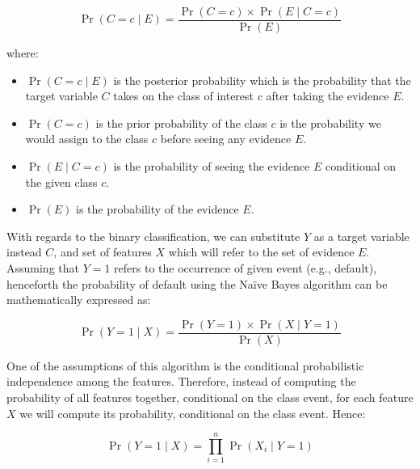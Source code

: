 \begin{equation}\label{eq}
    \operatorname{Pr}\left(C=c \mid E \right) = \frac{\operatorname{Pr}\left(C=c\right) \times \operatorname{Pr}\left(E \mid C=c\right)}{\operatorname{Pr}\left(E\right)}
\end{equation}

where:
\begin{itemize}\setlength\itemsep{0em}
	\item $\operatorname{Pr}\left(C=c \mid E \right)$ is the posterior probability which is the probability that the target variable $C$ takes on the class of interest $c$ after taking the evidence $E$.
	\item $\operatorname{Pr}\left(C=c\right)$  is the prior probability of the class $c$ is the probability we would assign to the class $c$ before seeing any evidence $E$.
	\item $\operatorname{Pr}\left(E \mid C=c\right)$ is the probability of seeing the evidence $E$ conditional on the given class $c$.
	\item $\operatorname{Pr}\left(E\right)$ is the probability of the evidence $E$.
\end{itemize}

With regards to the binary classification, we can substitute $Y$ as a target variable instead $C$, and set of features $X$ which will refer to the set of evidence $E$.
Assuming that $Y=1$ refers to the occurrence of given event (e.g., default), henceforth the probability of default using the Naïve Bayes algorithm can be mathematically expressed as:

\begin{equation}\label{eq}
    \operatorname{Pr}\left(Y=1 \mid X \right) = \frac{\operatorname{Pr}\left(Y=1\right) \times \operatorname{Pr}\left(X \mid Y=1 \right)}{\operatorname{Pr}\left(X\right)}
\end{equation}

One of the assumptions of this algorithm is the conditional probabilistic independence among the features.
Therefore, instead of computing the probability of all features together, conditional on the class event, for each feature $X$ we will compute its probability, conditional on the class event. Hence:

\begin{equation}\label{eq}
    \operatorname{Pr}\left(Y=1 \mid X \right) = \prod_{i=1}^{n} \operatorname{Pr}\left(X_i \mid Y=1\right)
\end{equation}

